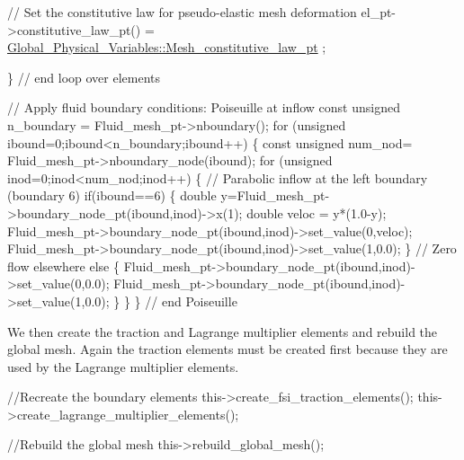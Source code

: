 \begin{DoxyCodeInclude}
     \textcolor{comment}{// Set the constitutive law for pseudo-elastic mesh deformation}
     el\_pt->constitutive\_law\_pt() =
      \hyperlink{namespaceGlobal__Physical__Variables_aac1b52d0b82bc48d24dfcb031d9dc25f}{Global\_Physical\_Variables::Mesh\_constitutive\_law\_pt}
      ;
     
    \} \textcolor{comment}{// end loop over elements}
   
   
   \textcolor{comment}{// Apply fluid boundary conditions: Poiseuille at inflow}
   \textcolor{keyword}{const} \textcolor{keywordtype}{unsigned} n\_boundary = Fluid\_mesh\_pt->nboundary();
   \textcolor{keywordflow}{for} (\textcolor{keywordtype}{unsigned} ibound=0;ibound<n\_boundary;ibound++)
    \{
     \textcolor{keyword}{const} \textcolor{keywordtype}{unsigned} num\_nod= Fluid\_mesh\_pt->nboundary\_node(ibound);
     \textcolor{keywordflow}{for} (\textcolor{keywordtype}{unsigned} inod=0;inod<num\_nod;inod++)
      \{
       \textcolor{comment}{// Parabolic inflow at the left boundary (boundary 6)}
       \textcolor{keywordflow}{if}(ibound==6)
        \{
         \textcolor{keywordtype}{double} y=Fluid\_mesh\_pt->boundary\_node\_pt(ibound,inod)->x(1);
         \textcolor{keywordtype}{double} veloc = y*(1.0-y);
         Fluid\_mesh\_pt->boundary\_node\_pt(ibound,inod)->set\_value(0,veloc);
         Fluid\_mesh\_pt->boundary\_node\_pt(ibound,inod)->set\_value(1,0.0);
        \}
       \textcolor{comment}{// Zero flow elsewhere}
       \textcolor{keywordflow}{else} 
        \{
         Fluid\_mesh\_pt->boundary\_node\_pt(ibound,inod)->set\_value(0,0.0);
         Fluid\_mesh\_pt->boundary\_node\_pt(ibound,inod)->set\_value(1,0.0);
        \}
      \}
    \} \textcolor{comment}{// end Poiseuille}

\end{DoxyCodeInclude}


We then create the traction and Lagrange multiplier elements and rebuild the global mesh. Again the traction elements must be created first because they are used by the Lagrange multiplier elements.


\begin{DoxyCodeInclude}
   
   \textcolor{comment}{//Recreate the boundary elements}
   this->create\_fsi\_traction\_elements();
   this->create\_lagrange\_multiplier\_elements();
   
   \textcolor{comment}{//Rebuild the global mesh}
   this->rebuild\_global\_mesh();

\end{DoxyCodeInclude}


